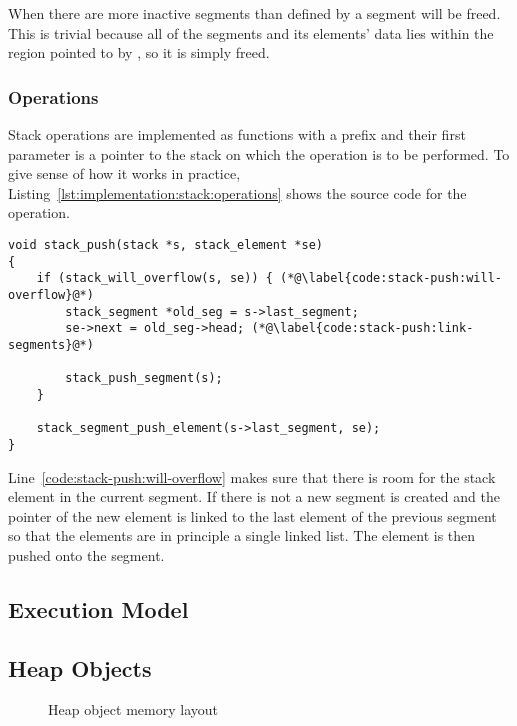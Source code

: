 When there are more inactive segments than defined by
 a segment will be freed. This is trivial
because all of the segments and its elements' data lies within the region
pointed to by , so it is simply freed.

\subsubsection{Operations}

Stack operations are implemented as functions with a  prefix and
their first parameter is a pointer to the stack on which the operation is to be
performed. To give sense of how it works in practice,
Listing~\ref{lst:implementation:stack:operations} shows the source code for the
 operation.

\begin{minipage}{\linewidth}
\begin{lstlisting}[language={[ANSI]C},
  caption={Source code of the \code{push} stack operation},
  label={lst:implementation:stack:operations}]
void stack_push(stack *s, stack_element *se)
{
    if (stack_will_overflow(s, se)) { (*@\label{code:stack-push:will-overflow}@*)
        stack_segment *old_seg = s->last_segment;
        se->next = old_seg->head; (*@\label{code:stack-push:link-segments}@*)

        stack_push_segment(s);
    }

    stack_segment_push_element(s->last_segment, se);
}
\end{lstlisting}
\end{minipage}

Line~\ref{code:stack-push:will-overflow} makes sure that there is room for the
stack element in the current segment. If there is not a new segment is created
and the  pointer of the new element is linked to the last element of
the previous segment so that the elements are in principle a single linked
list. The element is then pushed onto the segment.

\subsection{Execution Model}


\subsection{Heap Objects}

\begin{figure}[H]
  \centering
  
  \caption{Heap object memory layout}
\end{figure}


